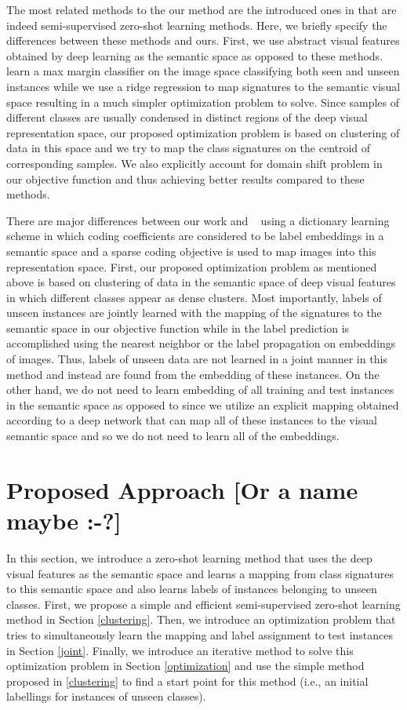 \documentclass[10pt,twocolumn,letterpaper]{article}
\begin{document}
 The most related methods to the our method are the introduced ones in \cite{li15max, semi15, Kodirov2015} that are indeed semi-supervised zero-shot learning methods. Here, we briefly specify the differences between these methods and ours. First, we use abstract visual features obtained by deep learning as the semantic space as opposed to these methods. \cite{li15max, semi15}
learn a max margin classifier on the image space classifying both seen and unseen instances while we use a ridge regression to map signatures to the semantic visual space resulting in a much simpler optimization problem to solve. Since samples of different classes are usually condensed in distinct regions of the deep visual representation space, our proposed optimization problem is based on clustering of data in this space and we try to map the class signatures on the centroid of corresponding samples. We also explicitly account for domain shift problem in our objective function and thus achieving better results compared to these methods.

There are major differences between our work and ~\cite{Kodirov2015} using a dictionary learning scheme in which coding coefficients are considered to be label embeddings in a semantic space and a sparse coding objective is used to map images into this representation space. First, our proposed optimization problem as mentioned above is based on clustering of data in the semantic space of deep visual features in which different classes appear as dense clusters. Most importantly, labels of unseen instances are jointly learned with the mapping of the signatures to the semantic space in our objective function while in \cite{Kodirov2015} the label prediction is accomplished using the nearest neighbor or the label propagation on embeddings of images. Thus, labels of unseen data are not learned in a joint manner in this method and instead are found from the embedding of these instances. On the other hand, we do not need to learn embedding of all training and test instances in the semantic space as opposed to \cite{Kodirov2015} since we utilize an explicit mapping obtained according to a deep network that can map all of these instances to the visual semantic space and so we do not need to learn all of the embeddings.

\section{Proposed Approach [Or a name maybe :-?]} \label{proposed}
In this section, we introduce a zero-shot learning method that uses the deep visual features as the semantic space and learns a mapping from class signatures to this semantic space and also learns labels of instances belonging to unseen classes. First, we propose a simple and efficient semi-supervised zero-shot learning method in Section \ref{clustering}. Then, we introduce an optimization problem that tries to simultaneously learn the mapping and label assignment to test instances in Section \ref{joint}. Finally, we introduce an iterative method to solve this optimization problem in Section \ref{optimization} and use the simple method proposed in \ref{clustering} to find a start point for this method (i.e., an initial labellings for instances of unseen classes).
\end{document}
